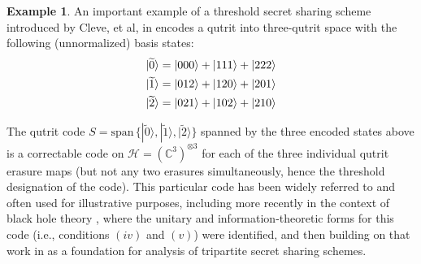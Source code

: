 \documentclass[11pt]{amsart}
\theoremstyle{definition}
\newtheorem{example}[thm]{Example}
\theoremstyle{definition}
\theoremstyle{definition}
\newcommand{\1}{\mathbb{I}}
\def\ket#1{| #1 \rangle}
\begin{document}
\begin{example}
An important example of a threshold secret sharing scheme introduced by Cleve, et al, in 
\cite{cleve1999share} encodes a qutrit into three-qutrit space with the following (unnormalized) basis states: 
    \begin{align}
        \ket{\widetilde{0}} = \ket{000} + \ket{111} + \ket{222}  \notag \\
       \ket{\widetilde{1}} = \ket{012} + \ket{120} + \ket{201} \notag \\ 
       \ket{\widetilde{2}} = \ket{021} + \ket{102} + \ket{210} \notag
    \end{align}


The qutrit code $S= \mathrm{span}\, \{ \ket{\widetilde{0}}, \ket{\widetilde{1}}, \ket{\widetilde{2}} \}$ spanned by the three encoded states above is a correctable code on $\mathcal H = (\mathbb C^3)^{\otimes 3}$ for each of the three individual qutrit erasure maps (but not any two erasures simultaneously, hence the threshold designation of the code). This particular code has been widely referred to and often used for illustrative purposes, including more recently in the context of black hole theory \cite{AXH15}, where the unitary and information-theoretic forms for this code (i.e., conditions $(iv)$ and $(v)$) were identified, and then building on that work in \cite{10206477} as a foundation for analysis of tripartite secret sharing schemes. 


\end{example}
\end{document}

